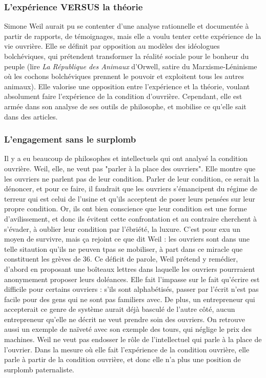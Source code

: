 \documentclass[a4paper,12pt]{book}
\begin{document}
\subsubsection{L'expérience VERSUS la théorie}
Simone Weil aurait pu se contenter d'une analyse rationnelle et documentée à partir de rapports, de témoignages, mais elle a voulu tenter cette expérience de la vie ouvrière. Elle se définit par opposition au modèles des idéologues bolchéviques, qui prétendent transformer la réalité sociale pour le bonheur du peuple (lire \textit{La République des Animaux} d'Orwell, satire du Marxisme-Léninisme où les cochons bolchéviques prennent le pouvoir et exploitent tous les autres animaux). Elle valorise une opposition entre l'expérience et la théorie, voulant absolument faire l'expérience de la condition d'ouvrière. Cependant, elle est armée dans son analyse de ses outils de philosophe, et mobilise ce qu'elle sait dans des articles.

\subsubsection{L'engagement sans le surplomb}
Il y a eu beaucoup de philosophes et intellectuels qui ont analysé la condition ouvrière. Weil, elle, ne veut pas "parler à la place des ouvriers". Elle montre que les ouvriers ne parlent pas de leur condition. Parler de leur condition, ce serait la dénoncer, et pour ce faire, il faudrait que les ouvriers s'émancipent du régime de terreur qui est celui de l'usine et qu'ils acceptent de poser leurs pensées sur leur propre condition. Or, ils ont bien conscience que leur condition est une forme d'avilissement, et donc ils évitent cette confrontation et au contraire cherchent à s'évader, à oublier leur condition par l'ébriété, la luxure. C'est pour exu un moyen de survivre, mais ça rejoint ce que dit Weil : les ouvriers sont dans une telle sitaution qu'ils ne peuven tpas se mobiliser, à part dans ce miracle que constituent les grèves de 36. Ce déficit de parole, Weil prétend y remédier, d'abord en proposant une boîteaux lettres dans laquelle les ouvriers pourrraient anonymement proposer leurs doléances. Elle fait l'impasse sur le fait qu'écrire est difficile pour certains ouvriers : s'ils sont alphabétisés, passer par l'écrit n'est pas facile pour des gens qui ne sont pas familiers avec. De plus, un entrepreneur qui accepterait ce genre de système aurait déjà basculé de l'autre côté, aucun entrepreneur qu'elle ne décrit ne veut prendre soin des ouvriers. On retrouve aussi un exemple de naïveté avec son exemple des tours, qui néglige le prix des machines. Weil ne veut pas endosser le rôle de l'intellectuel qui parle à la place de l'ouvrier. Dans la mesure où elle fait l'expérience de la condition ouvrière, elle parle à partir de la condition ouvrière, et donc elle n'a plus une position de surplomb paternaliste.
\end{document}
